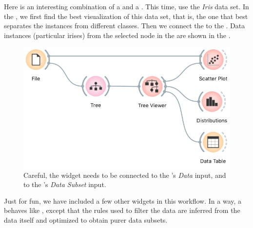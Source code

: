 Here is an interesting combination of a  and a . This time, use the \textit{Iris} data set. In the , we first find the best visualization of this data set, that is, the one that best separates the instances from different classes. Then we connect the  to the . Data instances (particular irises) from the selected node in the  are shown in the .

\begin{figure}[h]
    \centering
    \includegraphics[scale=0.4]{graphics/ch-classification_trees/workflow-inspection.png}
    \caption{Careful, the  widget needs to be connected to the 's \textit{Data} input, and  to the 's \textit{Data Subset} input.}
\end{figure}

Just for fun, we have included a few other widgets in this workflow. In a way, a  behaves like , except that the rules used to filter the data are inferred from the data itself and optimized to obtain purer data subsets.

